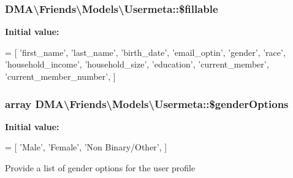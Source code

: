 \subsubsection[{\$fillable}]{\setlength{\rightskip}{0pt plus 5cm}D\+M\+A\textbackslash{}\+Friends\textbackslash{}\+Models\textbackslash{}\+Usermeta\+::\$fillable\hspace{0.3cm}{\ttfamily [protected]}}\label{classDMA_1_1Friends_1_1Models_1_1Usermeta_a1dca0217848634cab6e2ad205804e351}
{\bfseries Initial value\+:}
\begin{DoxyCode}
= [
        \textcolor{stringliteral}{'first\_name'},
        \textcolor{stringliteral}{'last\_name'},
        \textcolor{stringliteral}{'birth\_date'},
        \textcolor{stringliteral}{'email\_optin'},
        \textcolor{stringliteral}{'gender'},
        \textcolor{stringliteral}{'race'},
        \textcolor{stringliteral}{'household\_income'},
        \textcolor{stringliteral}{'household\_size'},
        \textcolor{stringliteral}{'education'},
        \textcolor{stringliteral}{'current\_member'},
        \textcolor{stringliteral}{'current\_member\_number'},
    ]
\end{DoxyCode}
\hypertarget{classDMA_1_1Friends_1_1Models_1_1Usermeta_a85cf8b9b7dd2582d64ac9e130dd0069d}{}
\subsubsection[{\$gender\+Options}]{\setlength{\rightskip}{0pt plus 5cm}array D\+M\+A\textbackslash{}\+Friends\textbackslash{}\+Models\textbackslash{}\+Usermeta\+::\$gender\+Options\hspace{0.3cm}{\ttfamily [static]}}\label{classDMA_1_1Friends_1_1Models_1_1Usermeta_a85cf8b9b7dd2582d64ac9e130dd0069d}
{\bfseries Initial value\+:}
\begin{DoxyCode}
= [
        \textcolor{stringliteral}{'Male'},
        \textcolor{stringliteral}{'Female'},
        \textcolor{stringliteral}{'Non Binary/Other'},
    ]
\end{DoxyCode}
Provide a list of gender options for the user profile \hypertarget{classDMA_1_1Friends_1_1Models_1_1Usermeta_a0578ccf8e50b07c1a6ec66118671d7a3}{}
